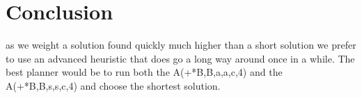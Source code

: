 \chapter{Conclusion}
\label{cha:conclusion}

as we weight a solution found quickly much higher than a short solution we prefer to use an advanced heuristic that does go a long way around once in a while.
The best planner would be to run both the A(+{*{B,B,a,a},c,4}) and the A(+{*{B,B,s,s},c,4}) and choose the shortest solution.
